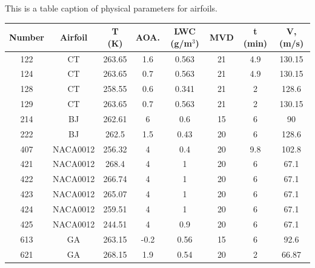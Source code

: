 \documentclass[aerospace,article,submit,moreauthors,pdftex]{Definitions/mdpi}
\begin{document}
\begin{specialtable}[H] 
\caption{This is a table caption of physical parameters for airfoils.\label{tab:cases}}
\begin{tabular}{cccccccc}
\toprule
\textbf{Number} & \textbf{Airfoil} & \textbf{T (K)} & \textbf{AOA}. & \textbf{LWC (g/m}$^3$\textbf{)} & \textbf{MVD} & \textbf{t (min)} & \textbf{V, (m/s)} \\
\midrule
122        & CT & 263.65       & 1.6    & 0.563      & 21            & 4.9              & 130.15          \\
124        & CT & 263.65       & 0.7    & 0.563      & 21            & 4.9              & 130.15          \\
128        & CT & 258.55       & 0.6    & 0.341      & 21            & 2                & 128.6           \\
129        & CT & 263.65       & 0.7    & 0.563      & 21            & 2                & 130.15          \\
214        & BJ         & 262.61       & 6      & 0.6        & 15            & 6                & 90              \\
222        & BJ         & 262.5        & 1.5    & 0.43       & 20            & 6                & 128.6           \\
407        & NACA0012             & 256.32       & 4      & 0.4        & 20            & 9.8              & 102.8           \\
421        & NACA0012             & 268.4        & 4      & 1          & 20            & 6                & 67.1            \\
422        & NACA0012             & 266.74       & 4      & 1          & 20            & 6                & 67.1            \\
423        & NACA0012             & 265.07       & 4      & 1          & 20            & 6                & 67.1            \\
424        & NACA0012             & 259.51       & 4      & 1          & 20            & 6                & 67.1            \\
425        & NACA0012             & 244.51       & 4      & 0.9        & 20            & 6                & 67.1            \\
613        & GA     & 263.15       & -0.2   & 0.56       & 15            & 6                & 92.6            \\
621        & GA     & 268.15       & 1.9    & 0.54       & 20            & 2                & 66.87           \\

\end{tabular}
\end{specialtable}
\end{document}
